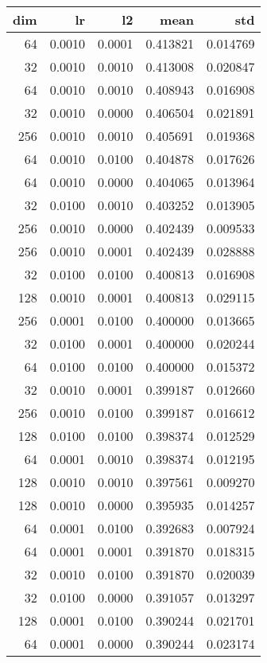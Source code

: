 \begin{tabular}{rrrrr}
\toprule
 dim &      lr &      l2 &      mean &       std \\
\midrule
  64 &  0.0010 &  0.0001 &  0.413821 &  0.014769 \\
  32 &  0.0010 &  0.0010 &  0.413008 &  0.020847 \\
  64 &  0.0010 &  0.0010 &  0.408943 &  0.016908 \\
  32 &  0.0010 &  0.0000 &  0.406504 &  0.021891 \\
 256 &  0.0010 &  0.0010 &  0.405691 &  0.019368 \\
  64 &  0.0010 &  0.0100 &  0.404878 &  0.017626 \\
  64 &  0.0010 &  0.0000 &  0.404065 &  0.013964 \\
  32 &  0.0100 &  0.0010 &  0.403252 &  0.013905 \\
 256 &  0.0010 &  0.0000 &  0.402439 &  0.009533 \\
 256 &  0.0010 &  0.0001 &  0.402439 &  0.028888 \\
  32 &  0.0100 &  0.0100 &  0.400813 &  0.016908 \\
 128 &  0.0010 &  0.0001 &  0.400813 &  0.029115 \\
 256 &  0.0001 &  0.0100 &  0.400000 &  0.013665 \\
  32 &  0.0100 &  0.0001 &  0.400000 &  0.020244 \\
  64 &  0.0100 &  0.0100 &  0.400000 &  0.015372 \\
  32 &  0.0010 &  0.0001 &  0.399187 &  0.012660 \\
 256 &  0.0010 &  0.0100 &  0.399187 &  0.016612 \\
 128 &  0.0100 &  0.0100 &  0.398374 &  0.012529 \\
  64 &  0.0001 &  0.0010 &  0.398374 &  0.012195 \\
 128 &  0.0010 &  0.0010 &  0.397561 &  0.009270 \\
 128 &  0.0010 &  0.0000 &  0.395935 &  0.014257 \\
  64 &  0.0001 &  0.0100 &  0.392683 &  0.007924 \\
  64 &  0.0001 &  0.0001 &  0.391870 &  0.018315 \\
  32 &  0.0010 &  0.0100 &  0.391870 &  0.020039 \\
  32 &  0.0100 &  0.0000 &  0.391057 &  0.013297 \\
 128 &  0.0001 &  0.0100 &  0.390244 &  0.021701 \\
  64 &  0.0001 &  0.0000 &  0.390244 &  0.023174 \\

\end{tabular}

